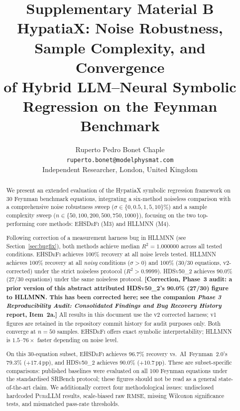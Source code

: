 \documentclass[twoside,11pt]{article}
\newcommand{\PureLLM}{\textsc{PureLLM}}
\newcommand{\EHD}{\textsc{EHSDeFi}}
\newcommand{\HSL}{\textsc{HLLMNN}}
\newcommand{\HDS}{\textsc{HDSv50\_2}}
\newcommand{\Rsq}{R^{2}}
\newcommand{\rmse}{\ensuremath{\mathrm{RMSE}}}
\begin{document}
\title{%
  Supplementary Material B\\[6pt]
  HypatiaX: Noise Robustness, Sample Complexity, and Convergence\\
  of Hybrid LLM--Neural Symbolic Regression on the Feynman Benchmark
}
\author{Ruperto Pedro Bonet Chaple\\
  \texttt{ruperto.bonet@modelphysmat.com}\\
  Independent Researcher, London, United Kingdom
}
\editor{}
\maketitle

\begin{abstract}
We present an extended evaluation of the HypatiaX symbolic regression
framework on 30 Feynman benchmark equations, integrating a six-method
noiseless comparison with a comprehensive noise robustness sweep
($\sigma \in \{0, 0.5, 1, 5, 10\}\%$) and a sample complexity sweep
($n \in \{50, 100, 200, 500, 750, 1000\}$), focusing on the two
top-performing core methods: \EHD{} (M3) and \HSL{} (M4).

Following correction of a measurement harness bug in \HSL{} (see
Section~\ref{sec:bugfix}), both methods achieve median $\Rsq = 1.000000$
across all tested conditions.
\EHD{} achieves 100\% recovery at all noise levels tested.
\HSL{} achieves 100\% recovery at all \emph{noisy} conditions ($\sigma > 0$)
and 100\% (30/30 equations, v2-corrected) under the strict noiseless protocol
($\Rsq > 0.9999$). \HDS{} achieves 90.0\% (27/30 equations) under the same
noiseless protocol.
\textbf{[Correction, Phase~3 audit: a prior version of this abstract attributed
\HDS's 90.0\% (27/30) figure to \HSL. This has been corrected here; see the
companion \emph{Phase 3 Reproducibility Audit: Consolidated Findings and Bug
Recovery History} report, Item~2a.]}
All results in this document use the v2 corrected harness; v1 figures are
retained in the repository commit history for audit purposes only.
Both converge at $n = 50$ samples.
\EHD{} offers exact symbolic interpretability; \HSL{} is $1.5$--$76\times$
faster depending on noise level.

On this 30-equation subset, \EHD{} achieves 96.7\% recovery vs.\ AI~Feynman~2.0's
79.3\% ($+17.4$\,pp), and \HDS{} achieves 90.0\% ($+10.7$\,pp).
These are subset-specific comparisons: published baselines were evaluated on
all 100 Feynman equations under the standardised SRBench protocol; these
figures should not be read as a general state-of-the-art claim.
We additionally correct four methodological issues:
undisclosed hardcoded \PureLLM{} results, scale-biased raw \rmse,
missing Wilcoxon significance tests, and mismatched pass-rate thresholds.
\end{abstract}
\end{document}
